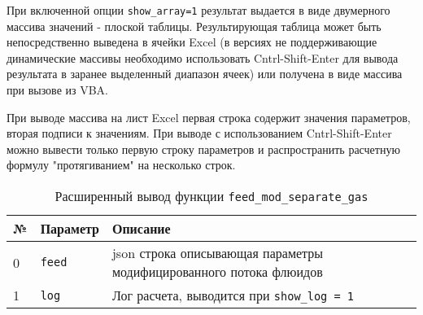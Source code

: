 При включенной опции \texttt{show_array=1} результат выдается в виде двумерного массива значений - плоской таблицы. Результирующая таблица может быть непосредственно выведена в ячейки Excel (в версиях не поддерживающие динамические массивы необходимо использовать Cntrl-Shift-Enter для вывода результата в заранее выделенный диапазон ячеек) или получена в виде массива при вызове из VBA.

При выводе массива на лист Excel первая строка содержит значения параметров, вторая подписи к значениям. При выводе с использованием Cntrl-Shift-Enter можно вывести только первую строку параметров и распространить расчетную формулу "протягиванием" на несколько строк.

\begin{table}[H]
	\caption{Расширенный вывод функции \texttt{feed_mod_separate_gas}}
	\label{table:param_list}
	\begin{tabular}{p{}p{}p{}}
		\hline
		№& Параметр & Описание  \\ \hline
		0 & \texttt{feed} & json строка описывающая параметры модифицированного потока флюидов    \\ \hline
		
		1 & \texttt{log} & Лог расчета, выводится при \texttt{show_log = 1}  \\ \hline
		
	\end{tabular}
\end{table}
